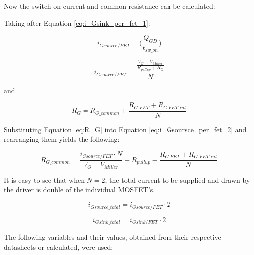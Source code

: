     Now the switch-on current and common resistance can be calculated:
    
    Taking after Equation \ref{eq:i_Gsink_per_fet_1}:

    \begin{equation}
        i_{Gsource/FET} = \bigg( \frac{Q_{GD}}{t_{sw{\_}on}} \bigg)
        \label{eq:i_Gsource_per_fet_1}
    \end{equation}    
    
    
    
    \begin{equation}
        i_{Gsource/FET} = \frac{\frac{V_G - V_{Miller}}{R_{pullup} + R_G}}{N}
        \label{eq:i_Gsoursce_per_fet_2}
    \end{equation}
    
    and
    
    \begin{equation}
        R_G = R_{G{\_}common} + \frac{R_{G{\_}FET} + R_{G{\_}FET{\_}int}}{N}
        \label{eq:R_G}
    \end{equation}
    
    Substituting Equation \ref{eq:R_G} into Equation \ref{eq:i_Gsoursce_per_fet_2} and rearranging them yields the following:
    
    \begin{equation}
        R_{G{\_}common} = \frac{i_{Gsource/FET} \cdot N}{V_G - V_{Miller}} - R_{pullup} - \frac{R_{G{\_}FET} + R_{G{\_}FET{\_}int}}{N}
        \label{eq:R_G_common}
    \end{equation}
    
    It is easy to see that when $N = 2$, the total current to be supplied and drawn by the driver is double of the individual MOSFET's.
    
    
    \begin{equation}
        i_{Gsource{\_}total} = i_{Gsource/FET} \cdot 2
        \label{eq:i_G_source_total}
    \end{equation}
    
    \begin{equation}
        i_{Gsink{\_}total} = i_{Gsink/FET} \cdot 2
        \label{eq:i_G_sink_total}
    \end{equation}
    
    The following variables and their values, obtained from their respective datasheets or calculated, were used:
    
